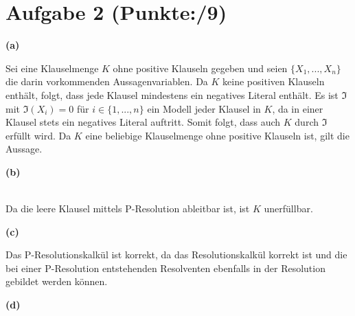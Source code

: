 \documentclass[11pt, a4paper]{article}
\newcommand{\p}{9}
\begin{document}
\section*{Aufgabe 2 (Punkte:\qquad/\p)}
\textbf{(a)}
\begin{adjustwidth}{20pt}{20pt}
	Sei eine Klauselmenge $K$ ohne positive Klauseln gegeben und seien $\{ X_1,...,X_n\}$ die darin vorkommenden Aussagenvariablen. Da $K$ keine
	positiven Klauseln enthält, folgt, dass jede Klausel mindestens ein negatives Literal enthält. Es ist $\mathfrak{I}$ mit $\mathfrak{I}(X_i)=0$ für $i \in \{ 1,...,n\}$
	ein Modell jeder Klausel in $K$, da in einer Klausel stets ein negatives Literal auftritt. Somit folgt, dass auch $K$ durch $\mathfrak{I}$ erfüllt wird. Da $K$ eine
	beliebige Klauselmenge ohne positive Klauseln ist, gilt die Aussage.
\end{adjustwidth}
\textbf{(b)}
\begin{adjustwidth}{20pt}{20pt}
\ \\
Da die leere Klausel mittels P-Resolution ableitbar ist, ist $K$ unerfüllbar.
\end{adjustwidth}
\textbf{(c)}
\begin{adjustwidth}{20pt}{20pt}
Das P-Resolutionskalkül ist korrekt, da das Resolutionskalkül korrekt ist und die bei einer P-Resolution entstehenden Resolventen ebenfalls in der Resolution gebildet werden können.
\end{adjustwidth}
\textbf{(d)}
\end{document}
